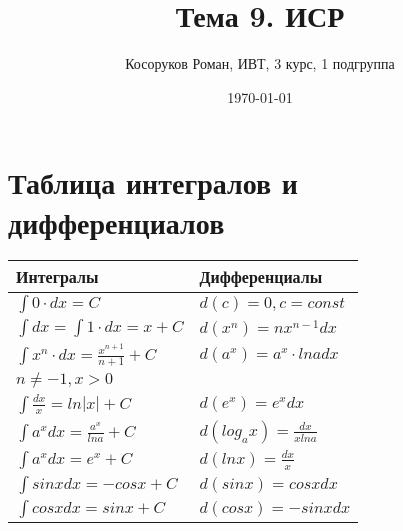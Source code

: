 \documentclass[a4paper,12pt]{article} %
\author{Косоруков Роман, ИВТ, 3 курс, 1 подгруппа}
\title{Тема 9. ИСР}
\date{\today}
\begin{document}
\maketitle
\newpage
\section{Таблица интегралов и дифференциалов}
\Large
\begin{tabular}{| l | l |}
\hline
\textbf{Интегралы} & \textbf{Дифференциалы} \\
\hline
$\int 0 \cdot dx = C$ & $d(c) = 0, c = const$\\[0.5cm]
$\int dx = \int 1 \cdot dx = x + C $ & $d(x^n) = nx^{n-1}dx$\\[0.5cm]
$\int x^n \cdot dx = \frac{x^{n+1}}{n+1} + C$ & $d(a^x) = a^x \cdot ln adx$\\
$n \neq -1, x > 0$ & \\[0.5cm]
$\int \frac{dx}{x} = ln|x| + C$ & $d(e^x) = e^xdx$\\[0.5cm]
$\int a^x dx = \frac{a^x}{ln a} + C $ & $d(log_ax) = \frac{dx}{x ln a} $\\[0.5cm]
$\int a^x dx = e^x + C $ & $d(ln x) = \frac{dx}{x} $\\[0.5cm]
$\int sinxdx = -cosx + C $ & $d(sinx) = cosxdx $\\[0.5cm]
$\int cosxdx = sinx + C $ & $d(cosx) = -sinxdx $\\[0.5cm]
\hline
\end{tabular}
\end{document}
